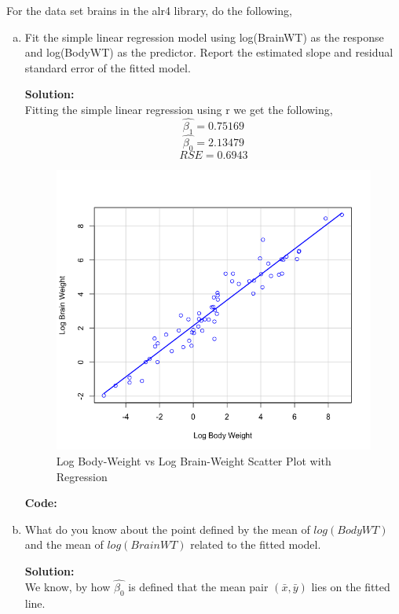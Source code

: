 \documentclass[12pt]{article}
\makeatletter
\theoremstyle{homework}
\newenvironment{exercise}[1]
{\def\@currentlabel{#1}\exercisecore}
{\endexercisecore}
\newcommand{\localhead}[1]{\par\smallskip\noindent\textbf{#1}\nobreak\\}%
\newcommand\solution{\localhead{Solution:}}
\makeatother
\begin{document}
\begin{exercise}{3} For the data set brains in the alr4 library, do the following,\\
  \begin{enumerate}[a.]
    \item Fit the simple linear regression model using log(BrainWT) as the response and log(BodyWT)
    as the predictor. Report the estimated slope and residual standard error of the fitted model.\\
    \solution Fitting the simple linear regression using r we get the following,
    \begin{equation*}
      \hat{\beta_1} = 0.75169
    \end{equation*}
    \begin{equation*}
      \hat{\beta_0} = 2.13479 
    \end{equation*}
    \begin{equation*}
     RSE = 0.6943
    \end{equation*}

  \begin{figure}[h]
    \begin{center}
    \caption{Log Body-Weight vs Log Brain-Weight Scatter Plot with Regression}
    \includegraphics[width=.66\textwidth]{Rplot3.png}
    \end{center}
  \end{figure}

  \textbf{Code:}
  \begin{center}
  
  \end{center} 

  \vspace{.15in}

  \item What do you know about the point defined by the mean of $log(BodyWT)$ and
  the mean of $log(BrainWT)$ related to the fitted model. \\
  \solution We know, by how $\hat{\beta_0}$ is defined that the mean pair $(\bar{x}, \bar{y})$
  lies on the fitted line. 
  \vspace{.15in}


\end{enumerate}
\end{exercise}
\end{document}
